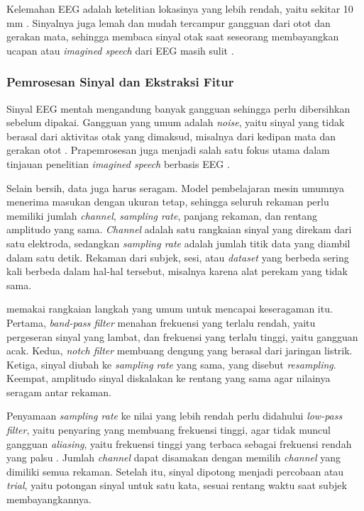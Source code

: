 Kelemahan EEG adalah ketelitian lokasinya yang lebih rendah, yaitu sekitar 10 mm \parencite{nicolasalonso2012}.
Sinyalnya juga lemah dan mudah tercampur gangguan dari otot dan gerakan mata, sehingga membaca sinyal otak saat seseorang membayangkan ucapan atau \textit{imagined speech} dari EEG masih sulit \parencite{lopezbernal2022}.

\subsubsection{Pemrosesan Sinyal dan Ekstraksi Fitur}
\label{sec:pemrosesan-sinyal}
Sinyal EEG mentah mengandung banyak gangguan sehingga perlu dibersihkan sebelum dipakai.
Gangguan yang umum adalah \textit{noise}, yaitu sinyal yang tidak berasal dari aktivitas otak yang dimaksud, misalnya dari kedipan mata dan gerakan otot \parencite{urigue2015}.
Prapemrosesan juga menjadi salah satu fokus utama dalam tinjauan penelitian \textit{imagined speech} berbasis EEG \parencite{lopezbernal2022}.

Selain bersih, data juga harus seragam.
Model pembelajaran mesin umumnya menerima masukan dengan ukuran tetap, sehingga seluruh rekaman perlu memiliki jumlah \textit{channel}, \textit{sampling rate}, panjang rekaman, dan rentang amplitudo yang sama.
\textit{Channel} adalah satu rangkaian sinyal yang direkam dari satu elektroda, sedangkan \textit{sampling rate} adalah jumlah titik data yang diambil dalam satu detik.
Rekaman dari subjek, sesi, atau \textit{dataset} yang berbeda sering kali berbeda dalam hal-hal tersebut, misalnya karena alat perekam yang tidak sama.

\textcite{zhou2025} memakai rangkaian langkah yang umum untuk mencapai keseragaman itu.
Pertama, \textit{band-pass filter} menahan frekuensi yang terlalu rendah, yaitu pergeseran sinyal yang lambat, dan frekuensi yang terlalu tinggi, yaitu gangguan acak.
Kedua, \textit{notch filter} membuang dengung yang berasal dari jaringan listrik.
Ketiga, sinyal diubah ke \textit{sampling rate} yang sama, yang disebut \textit{resampling}.
Keempat, amplitudo sinyal diskalakan ke rentang yang sama agar nilainya seragam antar rekaman.

Penyamaan \textit{sampling rate} ke nilai yang lebih rendah perlu didahului \textit{low-pass filter}, yaitu penyaring yang membuang frekuensi tinggi, agar tidak muncul gangguan \textit{aliasing}, yaitu frekuensi tinggi yang terbaca sebagai frekuensi rendah yang palsu \parencite{oppenheim2010}.
Jumlah \textit{channel} dapat disamakan dengan memilih \textit{channel} yang dimiliki semua rekaman.
Setelah itu, sinyal dipotong menjadi percobaan atau \textit{trial}, yaitu potongan sinyal untuk satu kata, sesuai rentang waktu saat subjek membayangkannya.

